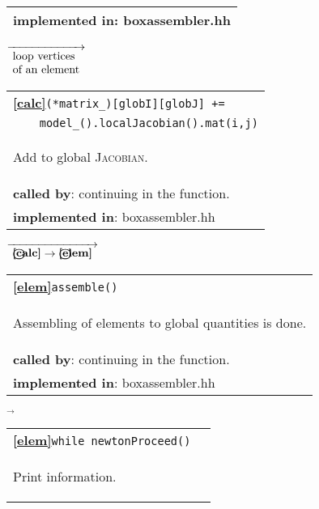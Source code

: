 \begin{landscape}
{\begin{tabular}{|l|}
      \textbf{implemented in}: boxassembler.hh\\ 
	\hline 
  \end{tabular}
 \nextline
   {\scriptsize$\overrightarrow{ 
    \begin{array}{l} 
    \textnormal{loop vertices}\\
    \textnormal{of an element}
    \end{array}}$}
   \begin{tabular}{|l|} 
      \hline 
      \textbf{\textcircled{\ref{calc}}}\verb?(*matrix_)[globI][globJ] +=? \\ 
		\verb?    model_().localJacobian().mat(i,j)? \\ 
      \begin{scriptsize}Add to global \textsc{Jacobian}.\end{scriptsize}\\
      \textbf{called by}: continuing in the function. \\ 
      \textbf{implemented in}: boxassembler.hh\\ 
	\hline 
  \end{tabular}
    {\scriptsize$\overrightarrow{
	  \begin{array}{l}
	   \textbf{\textcircled{\ref{calc}}}\rightarrow\textbf{\textcircled{\ref{elem}}}\\
           \end{array}
    }$}
   \begin{tabular}{|l|} 
      \hline 
      \textbf{\textcircled{\ref{elem}}}\verb?assemble()? \\ 
      \begin{scriptsize}Assembling of elements to global quantities is done.\end{scriptsize}\\
      \textbf{called by}: continuing in the function. \\ 
      \textbf{implemented in}: boxassembler.hh\\ 
	\hline 
  \end{tabular}
\nextline
    {$\overrightarrow{}
    $}
   \begin{tabular}{|l|} 
      \hline 
      \textbf{\textcircled{\ref{elem}}}\verb?while newtonProceed()  ?\\ 
      \begin{scriptsize}Print information.\end{scriptsize}\\

\end{tabular}}
\end{landscape}
